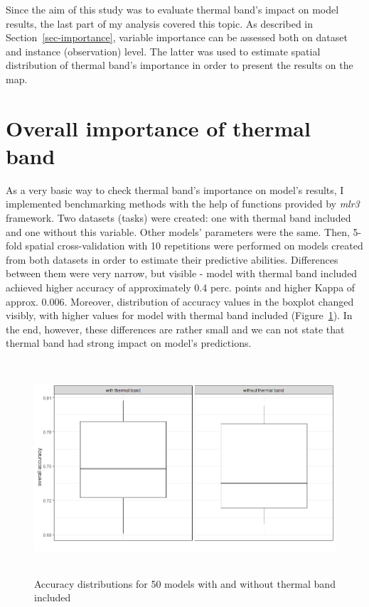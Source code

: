 \documentclass{amuthesis}
\begin{document}
Since the aim of this study was to evaluate thermal band's impact on
model results, the last part of my analysis covered this topic. As
described in Section~\ref{sec-importance}, variable importance can be
assessed both on dataset and instance (observation) level. The latter
was used to estimate spatial distribution of thermal band's importance
in order to present the results on the map.

\hypertarget{sec-imp-overall}{%
\section{Overall importance of thermal band}\label{sec-imp-overall}}

As a very basic way to check thermal band's importance on model's
results, I implemented benchmarking methods with the help of functions
provided by \emph{mlr3} framework. Two datasets (tasks) were created:
one with thermal band included and one without this variable. Other
models' parameters were the same. Then, 5-fold spatial cross-validation
with 10 repetitions were performed on models created from both datasets
in order to estimate their predictive abilities. Differences between
them were very narrow, but visible - model with thermal band included
achieved higher accuracy of approximately 0.4 perc. points and higher
Kappa of approx. 0.006. Moreover, distribution of accuracy values in the
boxplot changed visibly, with higher values for model with thermal band
included (Figure~\ref{fig-rycina12}). In the end, however, these
differences are rather small and we can not state that thermal band had
strong impact on model's predictions.

\begin{figure}[t]

{\centering \includegraphics[width=5.625in,height=3.125in]{./figures/model_comparison.png}

}

\caption{\label{fig-rycina12}Accuracy distributions for 50 models with
and without thermal band included}

\end{figure}
\end{document}
